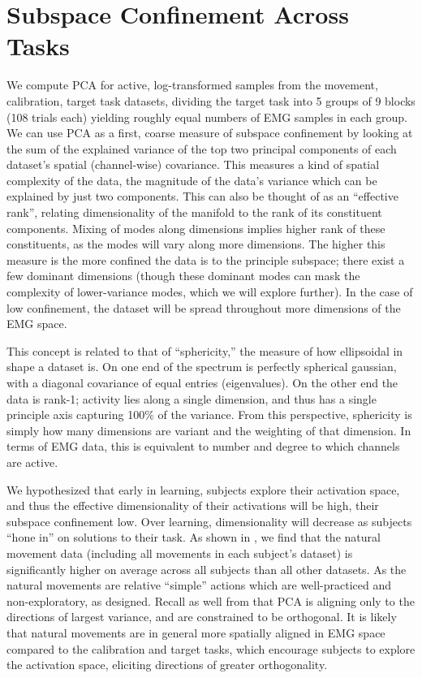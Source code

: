 \documentclass[../main.tex]{subfiles}
\begin{document}
\section{Subspace Confinement Across Tasks}

We compute PCA for active, log-transformed samples from the movement, calibration, target task datasets, dividing the target task into 5 groups of 9 blocks (108 trials each) yielding roughly equal numbers of EMG samples in each group. We can use PCA as a first, coarse measure of subspace confinement by looking at the sum of the explained variance of the top two principal components of each dataset's spatial (channel-wise) covariance. This measures a kind of spatial complexity of the data, the magnitude of the data's variance which can be explained by just two components. This can also be thought of as an ``effective rank'', relating dimensionality of the manifold to the rank of its constituent components. Mixing of modes along dimensions implies higher rank of these constituents, as the modes will vary along more dimensions. The higher this measure is the more confined the data is to the principle subspace; there exist a few dominant dimensions (though these dominant modes can mask the complexity of lower-variance modes, which we will explore further). In the case of low confinement, the dataset will be spread throughout more dimensions of the EMG space.

This concept is related to that of ``sphericity,'' the measure of how ellipsoidal in shape a dataset is. On one end of the spectrum is perfectly spherical gaussian, with a diagonal covariance of equal entries (eigenvalues). On the other end the data is rank-1; activity lies along a single dimension, and thus has a single principle axis capturing 100\% of the variance. From this perspective, sphericity is simply how many dimensions are variant and the weighting of that dimension. In terms of EMG data, this is equivalent to number and degree to which channels are active.

We hypothesized that early in learning, subjects explore their activation space, and thus the effective dimensionality of their activations will be high, their subspace confinement low. Over learning, dimensionality will decrease as subjects ``hone in'' on solutions to their task. As shown in , we find that the natural movement data (including all movements in each subject's dataset) is significantly higher on average across all subjects than all other datasets. As the natural movements are relative ``simple'' actions which are well-practiced and non-exploratory, as designed. Recall as well from  that PCA is aligning only to the directions of largest variance, and are constrained to be orthogonal. It is likely that natural movements are in general more spatially aligned in EMG space compared to the calibration and target tasks, which encourage subjects to explore the activation space, eliciting directions of greater orthogonality.
\end{document}
